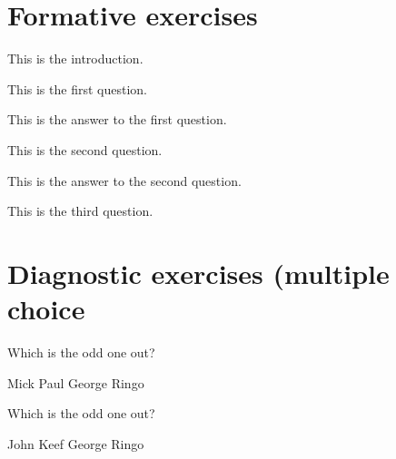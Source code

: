 \documentclass{camel}
\begin{document}
\section{Formative exercises}
\begin{formative}\label{fex:demo}
This is the introduction.
\begin{questions} 
\question This is the first question.\label{qu:fex:demo:first-question}
\begin{answer} 
This is the answer to the first question.
\end{answer} 
\question This is the second question.\label{qu:fex:demo:second-question}
\begin{answer} 
This is the answer to the second question.
\end{answer} 
\question This is the third question.\label{qu:fex:demo:third-question}
\end{questions} 
\end{formative}

\section{Diagnostic exercises (multiple choice}
\begin{diagnostic}\label{dex:demo} 
\begin{questions} 
\question Which is the odd one out? \label{qu:dex:demo:first-question}
\begin{choices} 
\correctchoice Mick
\choice Paul 
\choice George 
\choice Ringo 
\end{choices} 
\question Which is the odd one out? \label{qu:dex:demo:second-question} 
\begin{choices} 
\choice John 
\correctchoice Keef 
\choice George 
\choice Ringo 
\end{choices} 
\end{questions}
\end{diagnostic}
\end{document}
